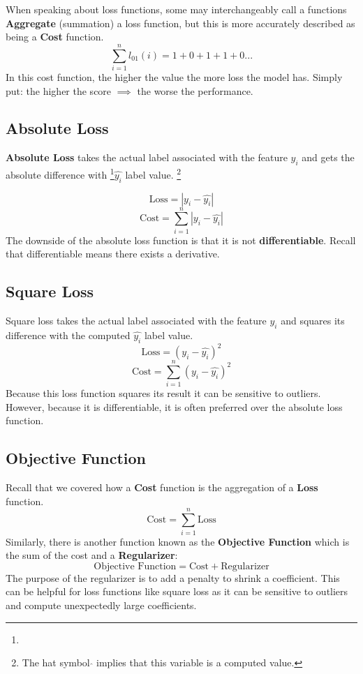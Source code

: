 When speaking about loss functions, some may interchangeably call a functions \textbf{Aggregate} (summation) a loss function, but this is more accurately described as being a \textbf{Cost} function.
\[ 
\sum_{i=1}^{n} l_{01}(i) = 1 + 0 + 1 + 1 + 0 . . . 
\]
In this cost function, the higher the value the more loss the model has. Simply put: the higher the score $\implies$ the worse the performance. 

\subsection{Absolute Loss}
\textbf{Absolute Loss} takes the actual label associated with the feature $y_i$ and gets the absolute difference with \footnote{}$\hat{y_i}$ label value.
\footnote[1]{The hat symbol $\hat{}$ implies that this variable is a computed value.}

\[ 
\text{Loss}=|y_i - \hat{y_i}|
\]
\[ 
\text{Cost}=\sum_{i=1}^{n} |y_i - \hat{y_i}|
\]
The downside of the absolute loss function is that it is not \textbf{differentiable}. Recall that differentiable means there exists a derivative.

\subsection{Square Loss}
Square loss takes the actual label associated with the feature $y_i$ and squares its difference with the computed $\hat{y_i}$ label value.
\[ 
\text{Loss}=(y_i - \hat{y_i})^2
\]
\[ 
\text{Cost}=\sum_{i=1}^{n} (y_i - \hat{y_i})^2
\]
Because this loss function squares its result it can be sensitive to outliers. However, because it is differentiable, it is often preferred over the absolute loss function.

\subsection{Objective Function}
Recall that we covered how a \textbf{Cost} function is the aggregation of a \textbf{Loss} function.
\[ 
\text{Cost}=\sum_{i=1}^{n} \text{Loss}
\]
Similarly, there is another function known as the \textbf{Objective Function} which is the sum of the cost and a \textbf{Regularizer}:
\[ 
\text{Objective Function}=\text{Cost} + \text{Regularizer}
\]
The purpose of the regularizer is to add a penalty to shrink a coefficient. This can be helpful for loss functions like square loss as it can be sensitive to outliers and compute unexpectedly large coefficients.

